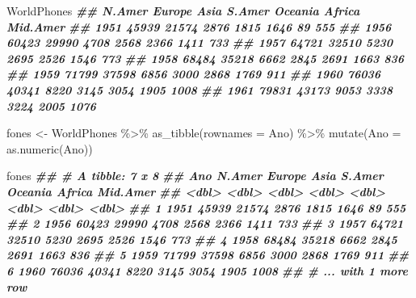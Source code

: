 \documentclass[
  11pt]{report}
\newenvironment{Shaded}{\begin{snugshade}}{\end{snugshade}}
\newcommand{\AttributeTok}[1]{\textcolor[rgb]{0.77,0.63,0.00}{#1}}
\newcommand{\DocumentationTok}[1]{\textcolor[rgb]{0.56,0.35,0.01}{\textbf{\textit{#1}}}}
\newcommand{\FunctionTok}[1]{\textcolor[rgb]{0.00,0.00,0.00}{#1}}
\newcommand{\NormalTok}[1]{#1}
\newcommand{\OtherTok}[1]{\textcolor[rgb]{0.56,0.35,0.01}{#1}}
\newcommand{\SpecialCharTok}[1]{\textcolor[rgb]{0.00,0.00,0.00}{#1}}
\newcommand{\StringTok}[1]{\textcolor[rgb]{0.31,0.60,0.02}{#1}}
\renewenvironment{Shaded}{
  \begin{mdframed}[%
    roundcorner=2pt,%
    innerleftmargin=5pt,%
    innerrightmargin=5pt,%
    topline=true,%
    leftline=true,%
    rightline=true,%
    bottomline=true,%
    linewidth=0.5pt,%
    linecolor=black!20,%
    backgroundcolor=black!2,%
    skipabove=2ex,%
    skipbelow=2.5ex%
  ]%
}
{
  \end{mdframed}
}
\begin{document}
\begin{Shaded}
\begin{Highlighting}[]
\NormalTok{WorldPhones}
\DocumentationTok{\#\#      N.Amer Europe Asia S.Amer Oceania Africa Mid.Amer}
\DocumentationTok{\#\# 1951  45939  21574 2876   1815    1646     89      555}
\DocumentationTok{\#\# 1956  60423  29990 4708   2568    2366   1411      733}
\DocumentationTok{\#\# 1957  64721  32510 5230   2695    2526   1546      773}
\DocumentationTok{\#\# 1958  68484  35218 6662   2845    2691   1663      836}
\DocumentationTok{\#\# 1959  71799  37598 6856   3000    2868   1769      911}
\DocumentationTok{\#\# 1960  76036  40341 8220   3145    3054   1905     1008}
\DocumentationTok{\#\# 1961  79831  43173 9053   3338    3224   2005     1076}
\end{Highlighting}
\end{Shaded}

\begin{Shaded}
\begin{Highlighting}[]
\NormalTok{fones }\OtherTok{\textless{}{-}}\NormalTok{ WorldPhones }\SpecialCharTok{\%\textgreater{}\%} 
  \FunctionTok{as\_tibble}\NormalTok{(}\AttributeTok{rownames =} \StringTok{\textquotesingle{}Ano\textquotesingle{}}\NormalTok{) }\SpecialCharTok{\%\textgreater{}\%} 
  \FunctionTok{mutate}\NormalTok{(}\AttributeTok{Ano =} \FunctionTok{as.numeric}\NormalTok{(Ano))}

\NormalTok{fones}
\DocumentationTok{\#\# \# A tibble: 7 x 8}
\DocumentationTok{\#\#     Ano N.Amer Europe  Asia S.Amer Oceania Africa Mid.Amer}
\DocumentationTok{\#\#   \textless{}dbl\textgreater{}  \textless{}dbl\textgreater{}  \textless{}dbl\textgreater{} \textless{}dbl\textgreater{}  \textless{}dbl\textgreater{}   \textless{}dbl\textgreater{}  \textless{}dbl\textgreater{}    \textless{}dbl\textgreater{}}
\DocumentationTok{\#\# 1  1951  45939  21574  2876   1815    1646     89      555}
\DocumentationTok{\#\# 2  1956  60423  29990  4708   2568    2366   1411      733}
\DocumentationTok{\#\# 3  1957  64721  32510  5230   2695    2526   1546      773}
\DocumentationTok{\#\# 4  1958  68484  35218  6662   2845    2691   1663      836}
\DocumentationTok{\#\# 5  1959  71799  37598  6856   3000    2868   1769      911}
\DocumentationTok{\#\# 6  1960  76036  40341  8220   3145    3054   1905     1008}
\DocumentationTok{\#\# \# ... with 1 more row}
\end{Highlighting}
\end{Shaded}
\end{document}
